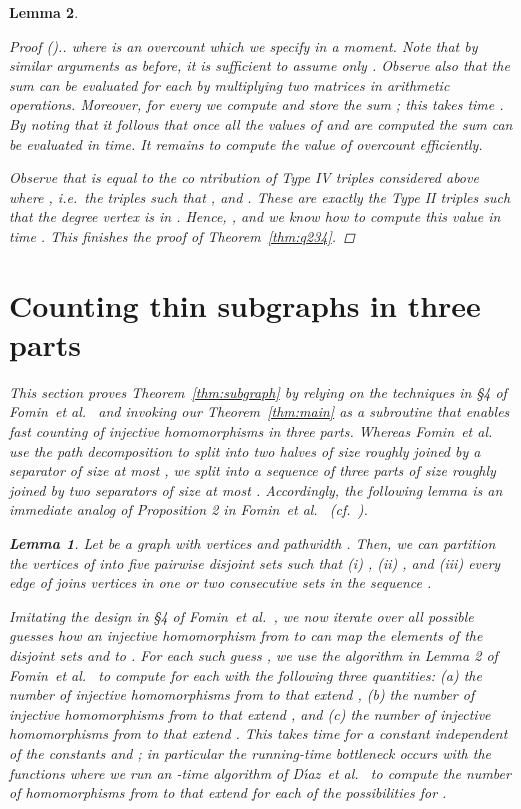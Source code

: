 \documentclass{amsart}
\newtheorem{Lem}{Lemma}
\begin{document}
\begin{Lem}
\begin{proof}[Proof ().]
where  is an overcount which we specify in a moment.
Note that by similar arguments as before, it is sufficient to assume only .
Observe also that the sum  can be evaluated for each  
by multiplying two  matrices in  arithmetic operations.
Moreover, for every  we compute and store the sum ; this takes time  . 
By noting that  it follows that once all the values of  and  are computed the sum  can be evaluated in  time.
It remains to compute the value of overcount  efficiently.

Observe that  is equal to the co ntribution of Type IV triples considered above where , i.e.\ the triples  such that ,  and . These are exactly the Type II triples such that the degree  vertex is in .
Hence, , and we know how to compute this value in time .
This finishes the proof of Theorem~\ref{thm:q234}.
\end{proof}



\section{Counting thin subgraphs in three parts}
\label{sect:homomorphims-in-three-parts}

This section proves Theorem~\ref{thm:subgraph} by relying on the techniques 
in \S4 of Fomin~{\em et al.}~\cite{FLRRS12} and invoking our 
Theorem~\ref{thm:main} as a subroutine that enables 
fast counting of injective homomorphisms in three parts.
Whereas Fomin~{\em et al.}~\cite{FLRRS12}
use the path decomposition to split  into two halves of size roughly 
 joined by a separator of size at most , we split  into 
a sequence of three parts of size roughly  joined by two separators 
of size at most . Accordingly, the following lemma is an immediate analog 
of Proposition 2 in Fomin~{\em et al.}~\cite{FLRRS12} (cf.~\cite{K92}).

\begin{Lem}
Let  be a graph with  vertices and pathwidth . Then, we can partition
the vertices of  into five pairwise disjoint sets  such that
(i) , (ii) , and (iii) every edge of 
joins vertices in one or two consecutive sets in the sequence . 
\end{Lem}

Imitating the design in \S4 of Fomin~{\em et al.}~\cite{FLRRS12},
we now iterate over all possible 
guesses  how an injective homomorphism from  to  can map 
the elements of the disjoint sets  and  to . For each such 
guess , we use the algorithm in Lemma 2 
of Fomin~{\em et al.}~\cite{FLRRS12} to compute 
for each  
with  the following three quantities:
(a) the number  of injective homomorphisms 
from  to  that extend , 
(b) the number  of injective homomorphisms 
from  to  that extend , 
and
(c) the number  of injective homomorphisms 
from  to  that extend .
This takes  time for a constant  independent
of the constants  and ; in particular the running-time bottleneck 
occurs with the functions  where we run an -time
algorithm of D{\'{\i}}az~{\em et al.}~\cite{DST02} to compute the number
of homomorphisms from  to 
that extend  for each of the  possibilities for 
.
 

\end{Lem}
\end{document}
